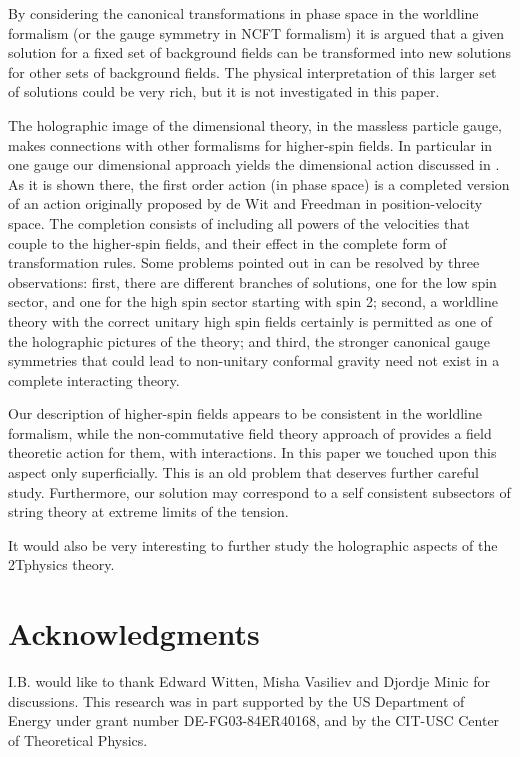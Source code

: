 \documentclass[a4paper,12pt]{article}
\begin{document}
By considering the canonical transformations in phase space in the worldline
formalism (or the gauge symmetry in NCFT formalism) it is argued that a
given solution for a fixed set of background fields can be transformed into
new solutions for other sets of background fields. The physical
interpretation of this larger set of solutions could be very rich, but it is
not investigated in this paper.

The holographic image of the \coordHE{} dimensional theory, in the massless
particle gauge, makes connections with other formalisms for higher-spin
fields. In particular in one gauge our \coordHE{} dimensional approach yields the
\coordHE{} dimensional action discussed in \cite{segal}. As it is shown there, the
first order action (in phase space) is a completed version of an action
originally proposed by de Wit and Freedman \cite{dwitf} in position-velocity
space. The completion consists of including all powers of the velocities
that couple to the higher-spin fields, and their effect in the complete form
of transformation rules. Some problems pointed out in \cite{segal} can be
resolved by three observations: first, there are different branches of
solutions, one for the low spin sector, and one for the high spin sector
starting with spin 2; second, a worldline theory with the correct unitary
high spin fields certainly is permitted as one of the holographic pictures
of the \coordHE{} theory; and third, the stronger canonical gauge symmetries that
could lead to non-unitary conformal gravity need not exist in a complete
interacting theory.

Our description of higher-spin fields appears to be consistent in the
worldline formalism, while the non-commutative field theory approach of \cite
{ncsp} provides a field theoretic action for them, with interactions. In
this paper we touched upon this aspect only superficially. This is an old
problem \cite{vasiliev} that deserves further careful study. Furthermore,
our solution may correspond to a self consistent subsectors of string theory
at extreme limits of the tension.

It would also be very interesting to further study the holographic aspects
of the 2Tphysics theory.

\section{Acknowledgments}

I.B. would like to thank Edward Witten, Misha Vasiliev and Djordje Minic for
discussions. This research was in part supported by the US Department of
Energy under grant number DE-FG03-84ER40168, and by the CIT-USC Center of
Theoretical Physics.
\end{document}
